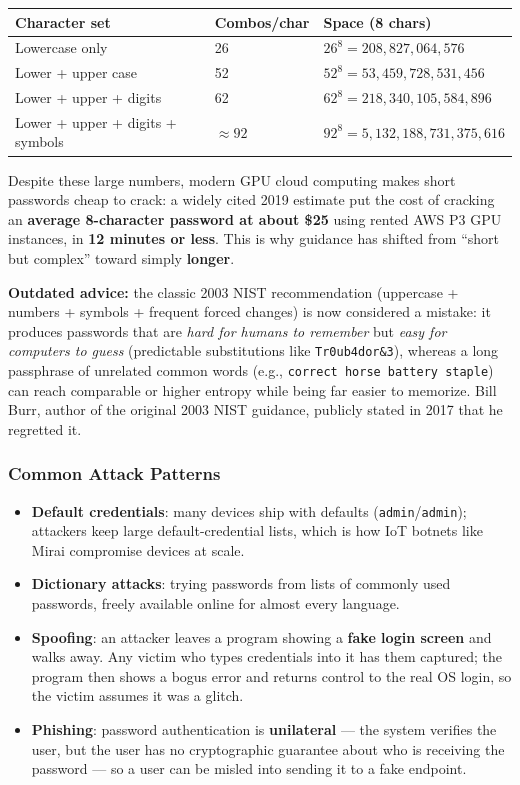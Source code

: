 \documentclass[12pt, a4paper]{article}
\begin{document}
\begin{center}
\begin{tabular}{@{}lll@{}}
\toprule
\textbf{Character set} & \textbf{Combos/char} & \textbf{Space (8 chars)} \\
\midrule
Lowercase only & 26 & $26^8 = 208{,}827{,}064{,}576$ \\
Lower + upper case & 52 & $52^8 = 53{,}459{,}728{,}531{,}456$ \\
Lower + upper + digits & 62 & $62^8 = 218{,}340{,}105{,}584{,}896$ \\
Lower + upper + digits + symbols & $\approx 92$ & $92^8 = 5{,}132{,}188{,}731{,}375{,}616$ \\
\bottomrule
\end{tabular}
\end{center}

Despite these large numbers, modern GPU cloud computing makes short passwords cheap to crack: a widely cited 2019 estimate put the cost of cracking an \textbf{average 8-character password at about \$25} using rented AWS P3 GPU instances, in \textbf{12 minutes or less}. This is why guidance has shifted from ``short but complex'' toward simply \textbf{longer}.

\textcolor{red!70!black}{\textbf{Outdated advice:}} the classic 2003 NIST recommendation (uppercase + numbers + symbols + frequent forced changes) is now considered a mistake: it produces passwords that are \emph{hard for humans to remember} but \emph{easy for computers to guess} (predictable substitutions like \texttt{Tr0ub4dor\&3}), whereas a long passphrase of unrelated common words (e.g., \texttt{correct horse battery staple}) can reach comparable or higher entropy while being far easier to memorize. Bill Burr, author of the original 2003 NIST guidance, publicly stated in 2017 that he regretted it.

\subsubsection{Common Attack Patterns}
\begin{itemize}
    \item \textbf{Default credentials}: many devices ship with defaults (\texttt{admin}/\texttt{admin}); attackers keep large default-credential lists, which is how IoT botnets like Mirai compromise devices at scale.
    \item \textbf{Dictionary attacks}: trying passwords from lists of commonly used passwords, freely available online for almost every language.
    \item \textbf{Spoofing}: an attacker leaves a program showing a \textbf{fake login screen} and walks away. Any victim who types credentials into it has them captured; the program then shows a bogus error and returns control to the real OS login, so the victim assumes it was a glitch.
    \item \textbf{Phishing}: password authentication is \textbf{unilateral} — the system verifies the user, but the user has no cryptographic guarantee about who is receiving the password — so a user can be misled into sending it to a fake endpoint.
\end{itemize}
\end{document}
